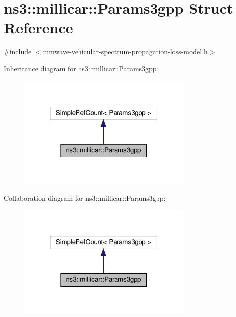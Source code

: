 \hypertarget{structns3_1_1millicar_1_1Params3gpp}{}\section{ns3\+:\+:millicar\+:\+:Params3gpp Struct Reference}
\label{structns3_1_1millicar_1_1Params3gpp}


{\ttfamily \#include $<$mmwave-\/vehicular-\/spectrum-\/propagation-\/loss-\/model.\+h$>$}



Inheritance diagram for ns3\+:\+:millicar\+:\+:Params3gpp\+:
\nopagebreak
\begin{figure}[H]
\begin{center}
\leavevmode
\includegraphics[width=241pt]{structns3_1_1millicar_1_1Params3gpp__inherit__graph}
\end{center}
\end{figure}


Collaboration diagram for ns3\+:\+:millicar\+:\+:Params3gpp\+:
\nopagebreak
\begin{figure}[H]
\begin{center}
\leavevmode
\includegraphics[width=241pt]{structns3_1_1millicar_1_1Params3gpp__coll__graph}
\end{center}
\end{figure}
